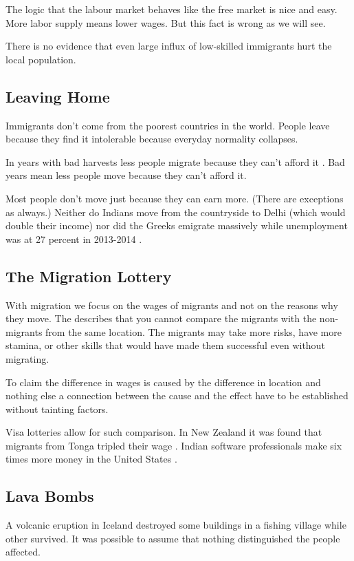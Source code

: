 \documentclass[a4paper, twocolumn]{article}
\newcommand{\keyword}[1]{\textbf{\color{black}{#1}}}
\begin{document}
The logic that the labour market behaves like the free market is nice and easy. More labor supply means lower wages. But this fact is wrong as we will see.

There is no evidence that even large influx of low-skilled immigrants hurt the local population.

\subsection{Leaving Home}
Immigrants don't come from the poorest countries in the world. People leave because they find it intolerable because everyday normality collapses.

In years with bad harvests less people migrate because they can't afford it \cite{push-and-pull}.
Bad years mean less people move because they can't afford it.

Most people don't move just because they can earn more. (There are exceptions as always.) Neither do Indians move from the countryside to Delhi (which would double their income) nor did the Greeks emigrate massively while unemployment was at 27 percent in 2013-2014 \cite{greek-emigration}.

\subsection{The Migration Lottery}
With migration we focus on the wages of migrants and not on the reasons why they move. The \keyword{identification problem} describes that you cannot compare the migrants with the non-migrants from the same location. The migrants may take more risks, have more stamina, or other skills that would have made them successful even without migrating.

To claim the difference in wages is caused by the difference in location and nothing else a connection between the cause and the effect have to be established without tainting factors.

Visa lotteries allow for such comparison. In New Zealand it was found that migrants from Tonga tripled their wage \cite{new-zealand-lottery}. Indian software professionals make six times more money in the United States \cite{usa-lottery}.

\subsection{Lava Bombs}
A volcanic eruption in Iceland destroyed some buildings in a fishing village while other survived. It was possible to assume that nothing distinguished the people affected.
\end{document}

